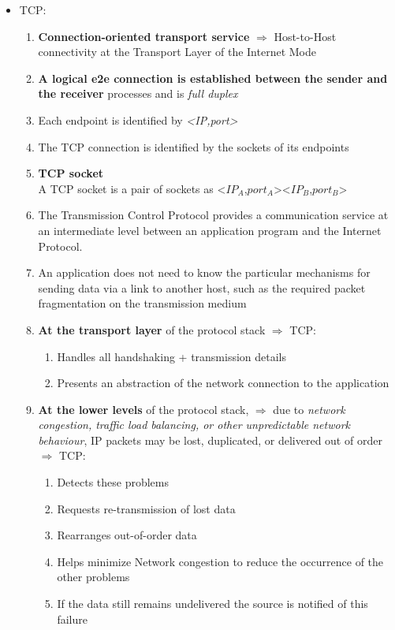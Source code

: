 \begin{itemize}
\item TCP: 
\begin{enumerate}
\item \textbf{Connection-oriented transport service} $\Rightarrow$ Host-to-Host connectivity at the Transport Layer of the Internet Mode
\item \textbf{A logical e2e connection is established between the sender and the receiver} processes and is \emph{full duplex}
\item Each endpoint is identified by \emph{<IP,port>}
\item The TCP connection is identified by the sockets of its endpoints
\item 
\begin{definition}{\textbf{TCP socket}\\}
A TCP socket is a pair of sockets as <$IP_A$,$port_A$><$IP_B$,$port_B$>
\end{definition}
\item The Transmission Control Protocol provides a communication service at an intermediate level between an application program and the Internet Protocol.
\item An application does not need to know the particular mechanisms for sending data via a link to another host, such as the required packet fragmentation on the transmission medium
\item \textbf{At the transport layer} of the protocol stack $\Rightarrow$ TCP:
\begin{enumerate}
\item Handles all handshaking + transmission details
\item Presents an abstraction of the network connection to the application
\end{enumerate}
\item \textbf{At the lower levels} of the protocol stack, $\Rightarrow$ due to \textit{network congestion, traffic load balancing, or other unpredictable network behaviour}, IP packets may be lost, duplicated, or delivered out of order $\Rightarrow$ TCP:
\begin{enumerate}
\item Detects these problems
\item Requests re-transmission of lost data
\item Rearranges out-of-order data 
\item Helps minimize Network congestion to reduce the occurrence of the other problems
\item If the data still remains undelivered the source is notified of this failure 

\end{enumerate}
\end{enumerate}
\end{itemize}
